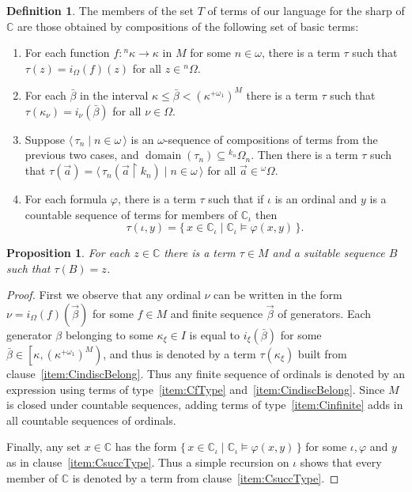 \documentclass[
twoside,
]{article}
\newtheorem{proposition}[theorem]{Proposition}
\theoremstyle{definition}
\newtheorem{definition}[theorem]{Definition}
\theoremstyle{remark}
\newcommand{\ords}{\Omega}
\renewcommand{\phi}{\varphi}
\newcommand{\set}[1]{\{\,#1\,\}}
\newcommand{\xset}[2]{\set{#1\mid#2}}
\newcommand{\pair}[1]{\langle#1\rangle}
\newcommand{\seq}[1]{\pair{\,#1\,}}
\newcommand{\restrict}{{\upharpoonright}}
\DeclareMathOperator{\domain}{domain}
\newcommand\chang{\mathbb{C}}
\begin{document}
\begin{definition}
  \label{def:Istardef}\label{def:terms}
  The members of the set $T$ of terms of our language for the sharp of $\chang$ are those 
  obtained by compositions
  of the following set of basic terms:
  \begin{enumerate}
  \item \label{item:CfType}For each function $f\colon {^n\kappa}\to
    \kappa$ in $M$ for some $n\in\omega$,
    there is a term $\tau$ such that $\tau(z)=i_{\ords}(f)(z)$  for
    all $z\in {^n\ords}$.
  \item\label{item:CindiscBelong} For each $\bar\beta$ in the interval
    $\kappa\leq\bar\beta<(\kappa^{+\omega_1})^{M}$ there is a term $\tau$ such
    that $\tau(\kappa_{\nu}) = i_{\nu}(\bar\beta)$ for all $\nu\in\ords$.

  \item\label{item:Cinfinite} Suppose 
    $\seq{\tau_n\mid n\in\omega}$  is an $\omega$-sequence of compositions of terms from the previous two
    cases, and $\domain(\tau_n)\subseteq{^{k_n}\Omega_n}$.   Then
    there is a term $\tau$ such that $\tau(\vec a)=\seq{\tau_n(\vec
      a\restrict k_{n})\mid n\in\omega}$ for all  $\vec 
    a\in{^{\omega}\Omega}$.
  \item \label{item:CsuccType}
    For each formula $\phi$, there is a  term $\tau$
    such that  if $\iota$ is an ordinal and $y$ is a countable sequence
    of terms for members of $\chang_{\iota}$ then
    \begin{equation*}
      \tau(\iota, y)=
      \xset{x\in    \chang_{\iota}}{\chang_{\iota}\models
        \phi(x, y)}.
    \end{equation*}
  \end{enumerate}
\end{definition}

\begin{proposition}
  \label{thm:terms-suffice}
  For each $z\in\chang$ there is a term $\tau\in M$ and a suitable
  sequence $B$ such that $\tau(B)=z$.
\end{proposition}
\begin{proof}
  First we observe that any ordinal $\nu$ can be written in the form
  $\nu=i_{\ords}(f)(\vec \beta)$ for some $f\in M$ and finite sequence
  $\vec \beta$ of generators.     Each generator $\beta$ belonging to
  some $\kappa_\xi\in I$ is equal to $i_{\xi}(\bar \beta)$ for some
  $\bar\beta\in\left[\kappa,(\kappa^{+\omega_1})^{M}\right)$,
  and thus is denoted by a term $\tau(\kappa_\xi)$
  built from
  clause~\ref{item:CindiscBelong}.    Thus any finite sequence of
  ordinals is denoted by an expression using terms of
  type~\ref{item:CfType} and~\ref{item:CindiscBelong}.   Since $M$ is closed under
  countable sequences, adding terms of type~\ref{item:Cinfinite} adds
  in all  countable sequences of ordinals.

  Finally, any set $x\in\chang$ has the form
  $\set{x\in\chang_{\iota}\mid \chang_{\iota}\models \phi(x,y)}$ for some
  $\iota,\phi$ and $y$ as in clause~\ref{item:CsuccType}.    Thus a
  simple recursion on $\iota$ shows that every member of $\chang$ is
  denoted by a term from clause~\ref{item:CsuccType}.
\end{proof}
\end{document}
